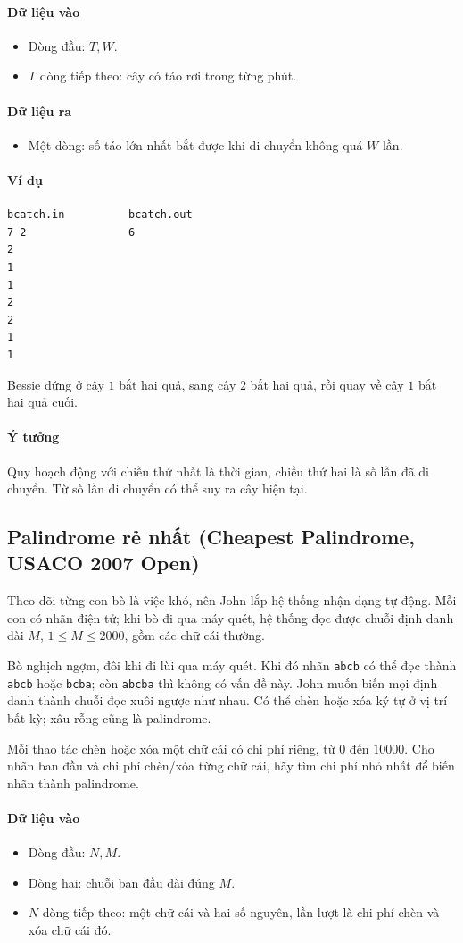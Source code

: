 \documentclass[11pt]{article}
\newcommand{\problem}[1]{\subsection{#1}}
\newcommand{\iosec}[1]{\paragraph{#1}}
\begin{document}
\iosec{Dữ liệu vào}
\begin{itemize}
  \item Dòng đầu: \(T,W\).
  \item \(T\) dòng tiếp theo: cây có táo rơi trong từng phút.
\end{itemize}

\iosec{Dữ liệu ra}
\begin{itemize}
  \item Một dòng: số táo lớn nhất bắt được khi di chuyển không quá \(W\) lần.
\end{itemize}

\iosec{Ví dụ}
\begin{verbatim}
bcatch.in          bcatch.out
7 2                6
2
1
1
2
2
1
1
\end{verbatim}

Bessie đứng ở cây \(1\) bắt hai quả, sang cây \(2\) bắt hai quả, rồi quay về cây \(1\) bắt hai quả cuối.

\iosec{Ý tưởng}
Quy hoạch động với chiều thứ nhất là thời gian, chiều thứ hai là số lần đã di chuyển. Từ số lần di chuyển có thể suy ra cây hiện tại.

\problem{Palindrome rẻ nhất (Cheapest Palindrome, USACO 2007 Open)}

Theo dõi từng con bò là việc khó, nên John lắp hệ thống nhận dạng tự động. Mỗi con có nhãn điện tử; khi bò đi qua máy quét, hệ thống đọc được chuỗi định danh dài \(M\), \(1 \le M \le 2000\), gồm các chữ cái thường.

Bò nghịch ngợm, đôi khi đi lùi qua máy quét. Khi đó nhãn \texttt{abcb} có thể đọc thành \texttt{abcb} hoặc \texttt{bcba}; còn \texttt{abcba} thì không có vấn đề này. John muốn biến mọi định danh thành chuỗi đọc xuôi ngược như nhau. Có thể chèn hoặc xóa ký tự ở vị trí bất kỳ; xâu rỗng cũng là palindrome.

Mỗi thao tác chèn hoặc xóa một chữ cái có chi phí riêng, từ \(0\) đến \(10000\). Cho nhãn ban đầu và chi phí chèn/xóa từng chữ cái, hãy tìm chi phí nhỏ nhất để biến nhãn thành palindrome.

\iosec{Dữ liệu vào}
\begin{itemize}
  \item Dòng đầu: \(N,M\).
  \item Dòng hai: chuỗi ban đầu dài đúng \(M\).
  \item \(N\) dòng tiếp theo: một chữ cái và hai số nguyên, lần lượt là chi phí chèn và xóa chữ cái đó.
\end{itemize}
\end{document}
